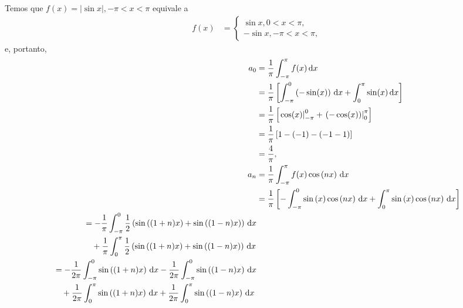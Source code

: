 \documentclass[a4paper,12pt, leqno, answers]{exam}
\begin{document}
\begin{questions}
\begin{parts}
\begin{solution}
            Temos que $f(x) = | \sin x |, -\pi < x < \pi$ equivale a
            \begin{align*}
                f(x) &= \begin{cases}
                    \sin x, 0 < x < \pi, \\
                    -\sin x, -\pi < x < \pi,
                \end{cases}
            \end{align*}
            e, portanto,
            \begin{align*}
                a_0 &= \frac{1}{\pi} \int_{-\pi}^\pi f(x) \id{x} \\
                &= \frac{1}{\pi} \left[ \int_{-\pi}^0 \left( - \sin(x) \right) \id{x} + \int_0^\pi \sin(x) \id{x} \right] \\
                &= \frac{1}{\pi} \left[ \left. \cos(x) \right|_{-\pi}^0 + \left. \left( -\cos(x) \right) \right|_0^\pi \right] \\
                &= \frac{1}{\pi} \left[ 1 - (-1) - \left( -1 - 1 \right) \right] \\
                &= \frac{4}{\pi}, \\
                a_n &= \frac{1}{\pi} \int_{-\pi}^\pi f(x) \cos\left( n x \right) \id{x} \\
                &= \frac{1}{\pi} \left[ -\int_{-\pi}^0 \sin\left( x \right) \cos\left( n x \right) \id{x} + \int_0^\pi \sin\left( x \right) \cos\left( n x \right) \id{x} \right] \\
                \begin{split}
                    &= - \frac{1}{\pi} \int_{-\pi}^0 \frac{1}{2} \left( \sin\left( (1 + n) x \right) + \sin\left( (1 - n) x \right) \right) \id{x} \\
                    &\quad {}+ \frac{1}{\pi} \int_0^\pi \frac{1}{2} \left( \sin\left( (1 + n) x \right) + \sin\left( (1 - n) x \right) \right) \id{x} \\
                \end{split} \\
                \begin{split}
                    &= - \frac{1}{2 \pi} \int_{-\pi}^0 \sin\left( (1 + n) x \right) \id{x} - \frac{1}{2 \pi} \int_{-\pi}^0 \sin\left( (1 - n) x \right) \id{x} \\
                    &\quad {}+ \frac{1}{2 \pi} \int_0^\pi \sin\left( (1 + n) x \right) \id{x} + \frac{1}{2 \pi} \int_0^\pi \sin\left( (1 - n) x \right) \id{x}
                \end{split} \\

\end{align*}
\end{solution}
\end{parts}
\end{questions}
\end{document}

